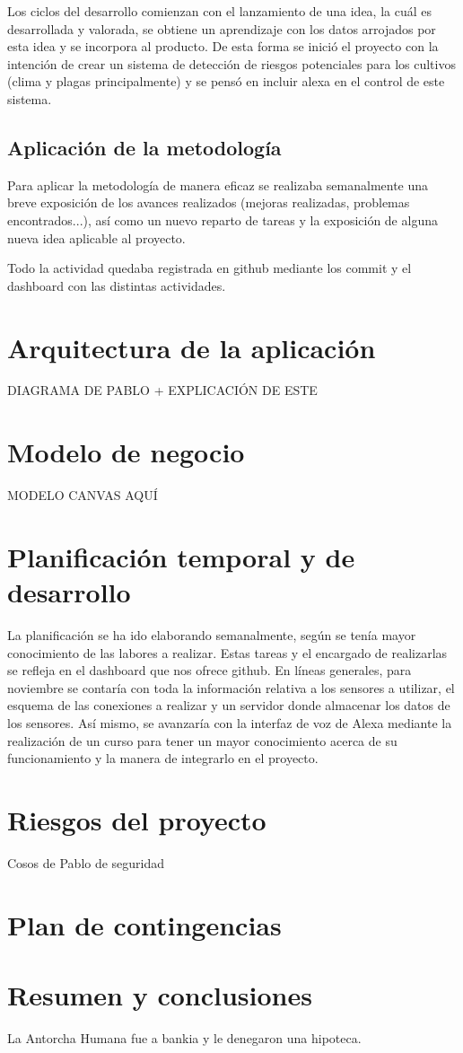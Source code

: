 Los ciclos del desarrollo comienzan con el lanzamiento de una idea, la cuál es desarrollada y valorada, se obtiene un aprendizaje con los datos arrojados por esta idea y se incorpora al producto. De esta forma se inició el proyecto con la intención de crear un sistema de detección de riesgos potenciales para los cultivos (clima y plagas principalmente) y se pensó en incluir alexa en el control de este sistema.


\subsection{Aplicación de la metodología}
Para aplicar la metodología de manera eficaz se realizaba semanalmente una breve exposición de los avances realizados (mejoras realizadas, problemas encontrados...), así como un nuevo reparto de tareas y la exposición de alguna nueva idea aplicable al proyecto.

Todo la actividad quedaba registrada en github mediante los commit y el dashboard con las distintas actividades.

\section{Arquitectura de la aplicación}
DIAGRAMA DE PABLO +  EXPLICACIÓN DE ESTE

\section{Modelo de negocio}

MODELO CANVAS AQUÍ 

\section{Planificación temporal y de desarrollo}
La planificación se ha ido elaborando semanalmente, según se tenía mayor conocimiento de las labores a realizar. Estas tareas y el encargado de realizarlas se refleja en el dashboard que nos ofrece github.
En líneas generales, para noviembre se contaría con toda la información relativa a los sensores a utilizar, el esquema de las conexiones a realizar y un servidor donde almacenar los datos de los sensores. Así mismo, se avanzaría con la interfaz de voz de Alexa mediante la realización de un curso para tener un mayor conocimiento acerca de su funcionamiento y la manera de integrarlo en el proyecto.

\section{Riesgos del proyecto}



Cosos de Pablo de seguridad

\section{Plan de contingencias}


\section{Resumen y conclusiones}
La Antorcha Humana fue a bankia y le denegaron una hipoteca.




